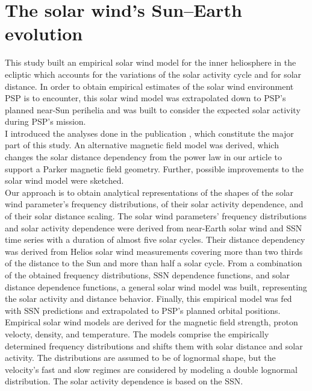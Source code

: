 \section{The solar wind's Sun--Earth evolution}

This study built an empirical solar wind model for the inner heliosphere in the ecliptic which accounts for the variations of the solar activity cycle and for solar distance. In order to obtain empirical estimates of the solar wind environment PSP is to encounter, this solar wind model was extrapolated down to PSP's planned near-Sun perihelia and was built to consider the expected solar activity during PSP's mission.\\

I introduced the analyses done in the publication \citet{Venzmer2018}, which constitute the major part of this study. An alternative magnetic field model was derived, which changes the solar distance dependency from the power law in our article to support a Parker magnetic field geometry. Further, possible improvements to the solar wind model were sketched.\\

Our approach is to obtain analytical representations of the shapes of the solar wind parameter’s frequency distributions, of their solar activity dependence, and of their solar distance scaling. The solar wind parameters’ frequency distributions and solar activity dependence were derived from near-Earth solar wind and SSN time series with a duration of almost five solar cycles. Their distance dependency was derived from Helios solar wind measurements covering more than two thirds of the distance to the Sun and more than half a solar cycle. From a combination of the obtained frequency distributions, SSN dependence functions, and solar distance dependence functions, a general solar wind model was built, representing the solar activity and distance behavior. Finally, this empirical model was fed with SSN predictions and extrapolated to PSP’s planned orbital positions.\\

Empirical solar wind models are derived for the magnetic field strength, proton velocty, density, and temperature. The models comprise the empirically determined frequency distributions and shifts them with solar distance and solar activity. The distributions are assumed to be of lognormal shape, but the velocity's fast and slow regimes are considered by modeling a double lognormal distribution. The solar activity dependence is based on the SSN.\\


